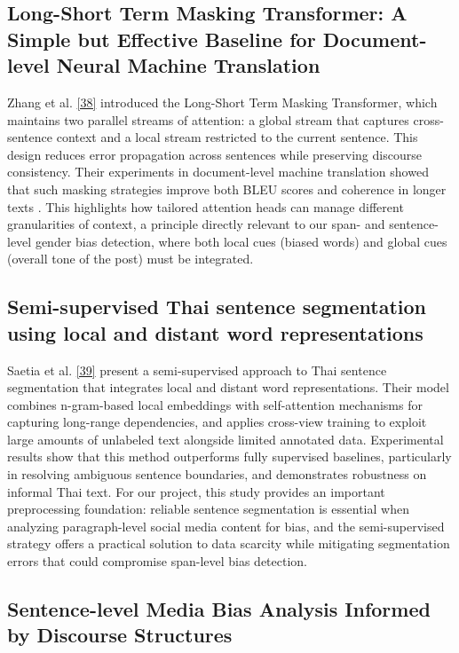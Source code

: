 \documentclass[12pt,oneside,openright,a4paper]{cpe-english-project}
\begin{document}
\subsection{Long-Short Term Masking Transformer: A Simple but Effective Baseline for Document-level Neural Machine Translation}

Zhang et al. \hyperlink{bib:ref38}{[38]} introduced the Long-Short Term Masking Transformer, which maintains two parallel streams of attention: a global stream that captures cross-sentence context and a local stream restricted to the current sentence. This design reduces error propagation across sentences while preserving discourse consistency. Their experiments in document-level machine translation showed that such masking strategies improve both BLEU scores and coherence in longer texts . This highlights how tailored attention heads can manage different granularities of context, a principle directly relevant to our span- and sentence-level gender bias detection, where both local cues (biased words) and global cues (overall tone of the post) must be integrated.

\subsection{Semi-supervised Thai sentence segmentation using local and distant word representations}

Saetia et al. \hyperlink{bib:ref39}{[39]} present a semi-supervised approach to Thai sentence segmentation that integrates local and distant word representations. Their model combines n-gram-based local embeddings with self-attention mechanisms for capturing long-range dependencies, and applies cross-view training to exploit large amounts of unlabeled text alongside limited annotated data. Experimental results show that this method outperforms fully supervised baselines, particularly in resolving ambiguous sentence boundaries, and demonstrates robustness on informal Thai text. For our project, this study provides an important preprocessing foundation: reliable sentence segmentation is essential when analyzing paragraph-level social media content for bias, and the semi-supervised strategy offers a practical solution to data scarcity while mitigating segmentation errors that could compromise span-level bias detection.

\subsection{Sentence-level Media Bias Analysis Informed by Discourse Structures}
\end{document}
